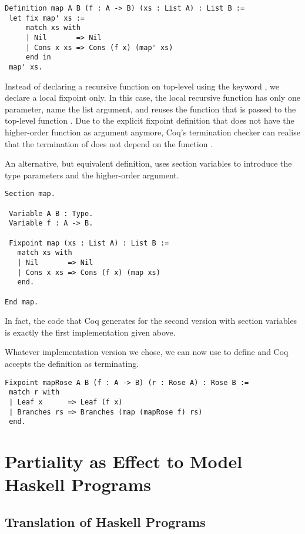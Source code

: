 \begin{excursus}
\begin{verbatim}
Definition map A B (f : A -> B) (xs : List A) : List B :=
 let fix map' xs :=
     match xs with
     | Nil       => Nil
     | Cons x xs => Cons (f x) (map' xs)
     end in
 map' xs.
\end{verbatim}

Instead of declaring a recursive function on top-level using the
keyword , we declare a local fixpoint only.
In this case, the local recursive function  has only one
parameter, name the list argument, and reuses the function 
that is passed to the top-level function .
Due to the explicit fixpoint definition that does not have the
higher-order function as argument anymore, Coq's termination checker
can realise that the termination of  does not depend on the
function .

An alternative, but equivalent definition, uses section variables to
introduce the type parameters and the higher-order argument.

\begin{verbatim}
Section map.

 Variable A B : Type.
 Variable f : A -> B.

 Fixpoint map (xs : List A) : List B :=
   match xs with
   | Nil       => Nil
   | Cons x xs => Cons (f x) (map xs)
   end.

End map.
\end{verbatim}

In fact, the code that Coq generates for the second version with
section variables is exactly the first implementation given above.

Whatever implementation version we chose, we can now use  to
define  and Coq accepts the definition as terminating.

\begin{verbatim}
Fixpoint mapRose A B (f : A -> B) (r : Rose A) : Rose B :=
 match r with
 | Leaf x      => Leaf (f x)
 | Branches rs => Branches (map (mapRose f) rs)
 end.
\end{verbatim}
\end{excursus}
\section{Partiality as Effect to Model Haskell Programs}
\subsection{Translation of Haskell Programs}
